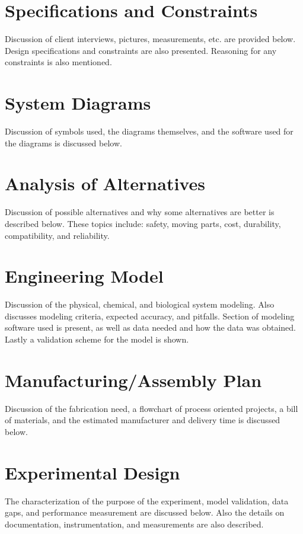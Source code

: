 \documentclass[12pt]{article}
\begin{document}
			\clearpage	
	
	\section{Specifications and Constraints}
	Discussion of client interviews, pictures, measurements, etc. are provided below. Design specifications and constraints are also presented. Reasoning for any constraints is also mentioned.
	
	\newpage
						
	\section{System Diagrams}
	Discussion of symbols used, the diagrams themselves, and the software used for the diagrams is discussed below.
	
	\newpage				
					
	\section{Analysis of Alternatives}
	Discussion of possible alternatives and why some alternatives are better is described below. These topics include: safety, moving parts, cost, durability, compatibility, and reliability.
	
	\newpage
	
	\section{Engineering Model}
	Discussion of the physical, chemical, and biological system modeling. Also discusses modeling criteria, expected accuracy, and pitfalls. Section of modeling software used is present, as well as data needed and how the data was obtained. Lastly a validation scheme for the model is shown.
	
	\newpage
	
	\section{Manufacturing/Assembly Plan}
	Discussion of the fabrication need, a flowchart of process oriented projects, a bill of materials, and the estimated manufacturer and delivery time is discussed below.
	
	\newpage
	
	\section{Experimental Design}
	The characterization of the purpose of the experiment, model validation, data gaps, and performance measurement are discussed below. Also the details on documentation, instrumentation, and measurements are also described.
		
\end{document}
